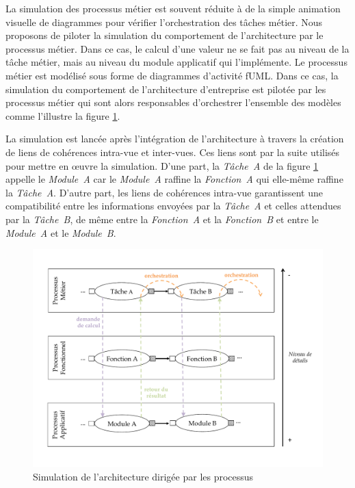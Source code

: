 La simulation des processus métier est souvent réduite à de la simple animation
visuelle de diagrammes pour vérifier l'orchestration des tâches métier. Nous
proposons de piloter la simulation du comportement de l'architecture par le
processus métier. Dans ce cas, le calcul d'une valeur ne se fait pas au niveau
de la tâche métier, mais au niveau du module applicatif qui l'implémente. Le processus
métier est modélisé sous forme de diagrammes d'activité fUML. Dans ce cas, la
simulation du comportement de l'architecture d'entreprise est pilotée par les
processus métier qui sont alors responsables d'orchestrer l'ensemble des modèles
comme l'illustre la figure \ref{fig:Simulation_Approche}. 

La simulation est
lancée après l'intégration de l'architecture à travers la création de liens de
cohérences intra-vue et inter-vues. Ces liens sont par la suite utilisés pour
mettre en œuvre la simulation. D'une part, la \textit{Tâche~A} de la figure
\ref{fig:Simulation_Approche} appelle le \textit{Module~A} car le
\textit{Module~A} raffine la \textit{Fonction~A} qui elle-même raffine la
\textit{Tâche~A}. D'autre part, les liens de cohérences intra-vue garantissent une
compatibilité entre les informations envoyées par la \textit{Tâche~A} et celles
attendues par la \textit{Tâche~B}, de même entre la \textit{Fonction~A} et la
\textit{Fonction~B} et entre le \textit{Module~A} et le \textit{Module~B}.

\begin{figure}[!ht]
    \centering
    \includegraphics[trim= 0cm 1cm 0cm 1cm, clip, width=1\textwidth]{figures/4_demarche/approche_simulation.pdf}
    \caption{Simulation de l'architecture dirigée par les processus}
    \label{fig:Simulation_Approche}
\end{figure}

